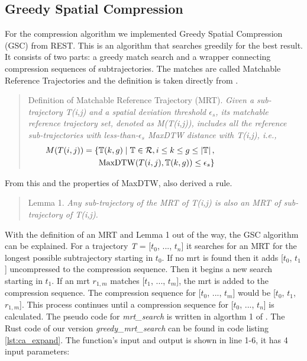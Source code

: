 \subsection{Greedy Spatial Compression}
For the compression algorithm we implemented Greedy Spatial Compression \break (GSC) from REST. This is an algorithm that searches greedily for the best result. It consists of two parts: a greedy match search and a wrapper connecting compression sequences of subtrajectories.
The matches are called Matchable Reference Trajectories and the definition is taken directly from \textcite{zhao2018rest}.
\begin{quote}
    Definition of Matchable Reference Trajectory (MRT). \textit{Given a sub-trajectory T(i,j) and a spatial deviation threshold $\epsilon_{s}$, its matchable reference trajectory set, denoted as M(T(i,j)), includes all the reference sub-trajectories with less-than-$\epsilon_{s}$ MaxDTW distance with T(i,j), i.e.,}
    \begin{align*}
        \hspace*{-3cm} M(T(i,j)) = \{ & \mathbb{T}(k,g) \mid \mathbb{T} \in \mathcal{R}, i \leq k \leq g \leq \left\lvert \mathbb{T} \right\rvert, \\
        \hspace*{-3cm}                & \text{MaxDTW}(T(i,j), \mathbb{T}(k,g)) \leq \epsilon_{s} \}
    \end{align*}
\end{quote}
From this and the properties of MaxDTW, \textcite{zhao2018rest} also derived a rule.

\begin{quote}
    \label{lemma}
    Lemma 1. \textit{Any sub-trajectory of the MRT of T(i,j) is also an MRT of sub-trajectory of T(i,j).}
\end{quote}

With the definition of an MRT and Lemma 1 out of the way, the GSC algorithm can be explained.
For a trajectory \textit{T} = [$t_0$, ..., $t_n$] it searches for an MRT for the longest possible subtrajectory starting in $t_0$. If no \acrshort{mrt} is found then it adds [$t_0$, $t_1$] uncompressed to the compression sequence. Then it begins a new search starting in $t_1$. If an \acrshort{mrt} $r_{1,m}$ matches [$t_1$, ..., $t_m$], the \acrshort{mrt} is added to the compression sequence. The compression sequence for [$t_0$, ..., $t_m$] would be [$t_0$, $t_1$, $r_{1,m}$]. This process continues until a compression sequence for [$t_0$, ..., $t_n$] is calculated. The pseudo code for \textit{mrt\_search} is written in algorthm 1 of \textcite{zhao2018rest}. The Rust code of our version \textit{greedy\_mrt\_search} can be found in code listing \ref{lst:ca_expand}. The function's input and output is shown in line 1-6, it has 4 input parameters:

